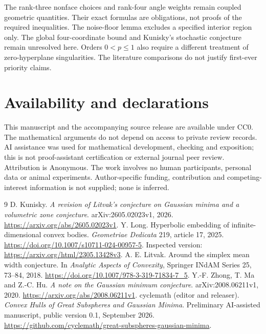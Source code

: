 \documentclass[11pt,a4paper]{article}
\theoremstyle{remark}\newtheorem{remark}[theorem]{Remark}
\begin{document}
The rank-three nonface choices and rank-four angle weights remain coupled geometric quantities. Their exact formulas are obligations, not proofs of the required inequalities. The noise-floor lemma excludes a specified interior region only. The global four-coordinate bound and Kunisky's stochastic conjecture remain unresolved here. Orders $0<p\le1$ also require a different treatment of zero-hyperplane singularities. The literature comparisons do not justify first-ever priority claims.

\section*{Availability and declarations}
This manuscript and the accompanying source release are available under CC0. The mathematical arguments do not depend on access to private review records. AI assistance was used for mathematical development, checking and exposition; this is not proof-assistant certification or external journal peer review. Attribution is Anonymous. The work involves no human participants, personal data or animal experiments. Author-specific funding, contribution and competing-interest information is not supplied; none is inferred.

\begin{thebibliography}{9}
 D. Kunisky.
\emph{A revision of Litvak's conjecture on Gaussian minima and a volumetric zone conjecture}.
arXiv:2605.02023v1, 2026.
\url{https://arxiv.org/abs/2605.02023v1}.
 Y. Long.
Hyperbolic embedding of infinite-dimensional convex bodies.
\emph{Geometriae Dedicata} 219, article 17, 2025.
\url{https://doi.org/10.1007/s10711-024-00957-5}.
Inspected version: \url{https://arxiv.org/html/2305.13428v3}.
 A. E. Litvak.
Around the simplex mean width conjecture.
In \emph{Analytic Aspects of Convexity}, Springer INdAM Series 25, 73--84, 2018.
\url{https://doi.org/10.1007/978-3-319-71834-7_5}.
 Y.-F. Zhong, T. Ma and Z.-C. Hu.
\emph{A note on the Gaussian minimum conjecture}.
arXiv:2008.06211v1, 2020.
\url{https://arxiv.org/abs/2008.06211v1}.
 cyclemath (editor and releaser).
\emph{Convex Hulls of Great Subspheres and Gaussian Minima}.
Preliminary AI-assisted manuscript, public version 0.1, September 2026.
\url{https://github.com/cyclemath/great-subspheres-gaussian-minima}.
\end{thebibliography}
\end{document}
